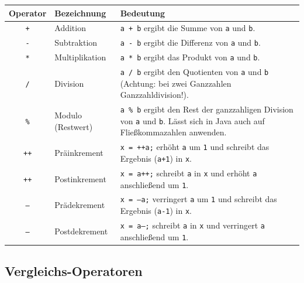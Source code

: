 \begin{tabularx}{\textwidth}{|c|l|X|}\hline
\textbf{Operator} & \textbf{Bezeichnung} & \textbf{Bedeutung}
\\ \hline
\texttt{+} & Addition & \texttt{a + b} ergibt die Summe von
\texttt{a} und \texttt{b}.
\\ \hline
\texttt{-} & Subtraktion & \texttt{a - b} ergibt die Differenz von
\texttt{a} und \texttt{b}.
\\ \hline
\texttt{*} & Multiplikation & \texttt{a * b} ergibt das Produkt
von \texttt{a} und \texttt{b}.
\\ \hline
\texttt{/} & Division & \texttt{a / b} ergibt den Quotienten
von \texttt{a} und \texttt{b} (Achtung: bei zwei Ganzzahlen Ganzzahldivision!).
\\ \hline
\texttt{\%} & Modulo (Restwert) & \texttt{a \% b} ergibt den Rest der
ganzzahligen Division von \texttt{a} und \texttt{b}. Lässt sich in Java auch auf Fließkommazahlen anwenden.
\\ \hline
\texttt{++} & Präinkrement & \texttt{x = ++a;} erhöht \texttt{a}
um \texttt{1} und schreibt das Ergebnis (\texttt{a+1}) in
\texttt{x}.
\\ \hline
\texttt{++} & Postinkrement & \texttt{x = a++;} schreibt
\texttt{a} in \texttt{x} und erhöht \texttt{a} anschließend um
\texttt{1}.
\\ \hline
\texttt{--} & Prädekrement & \texttt{x = --a;} verringert
\texttt{a} um \texttt{1} und schreibt das Ergebnis (\texttt{a-1})
in \texttt{x}.
\\ \hline
\texttt{--} & Postdekrement & \texttt{x = a--;} schreibt
\texttt{a} in \texttt{x} und verringert \texttt{a} anschließend
um \texttt{1}.
\\ \hline
\end{tabularx}


\subsection{Vergleichs-Operatoren}

